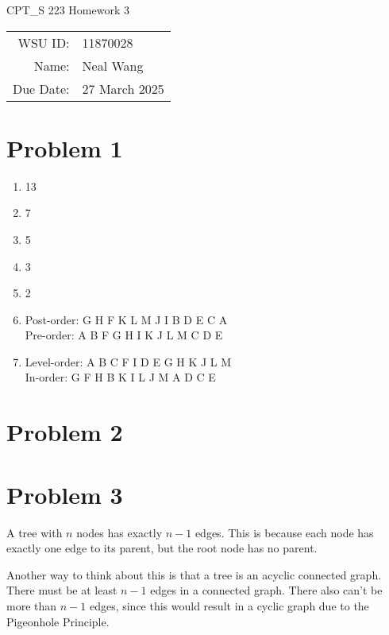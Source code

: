 \documentclass[12pt]{article}
\theoremstyle{definition}
\begin{document}
\begin{center}
  {\Large CPT\_S 223 Homework 3}
  $ $\\
  $ $\\
  \begin{tabular}{rl}
    WSU ID: & 11870028 \\
    Name: & Neal Wang \\
    Due Date: & 27 March 2025
  \end{tabular}
\end{center}

\section{Problem 1}

\begin{enumerate}[label=(\alph*)]
  \item 13
  \item 7
  \item 5
  \item 3
  \item 2
  \item Post-order: G H F K L M J I B D E C A \\
    Pre-order: A B F G H I K J L M C D E
  \item Level-order: A B C F I D E G H K J L M \\
    In-order: G F H B K I L J M A D C E
\end{enumerate}

\section{Problem 2}

\section{Problem 3}

A tree with $n$ nodes has exactly $n - 1$ edges. This is because each
node has exactly one edge to its parent, but the root node has no parent.

Another way to think about this is that a tree is an acyclic
connected graph. There must be at least $n - 1$ edges in a connected
graph. There also can't be more than $n - 1$ edges, since this would
result in a cyclic graph due to the Pigeonhole Principle.
\end{document}
